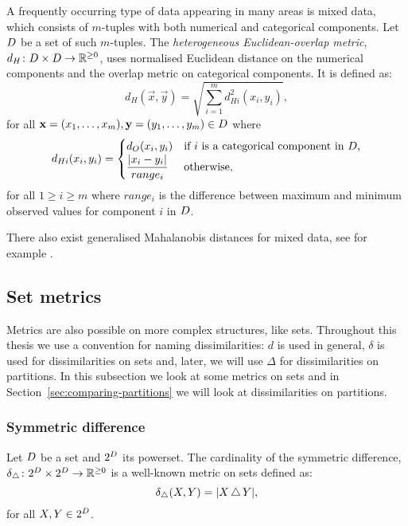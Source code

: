 A frequently occurring type of data appearing in many areas is mixed data,
which consists of $m$-tuples with both numerical and categorical components.
Let $D$ be a set of such $m$-tuples.  The \textit{heterogeneous
  Euclidean-overlap metric}, $d_{H} \colon D \times D \to
\mathbb{R}^{\geq 0}$, uses normalised Euclidean distance on the numerical
components and the overlap metric on categorical components.  It is defined
as:
\begin{equation*}
  d_{H}(\vec{x},\vec{y}) = \sqrt{\sum_{i=1}^{m} d_{Hi}^2(x_i,y_i)},
\end{equation*}
for all $\mathbf{x}=(x_1,\dotsc,x_m),\mathbf{y}=(y_1,\dotsc,y_m) \in D$ where
\begin{equation*}
  d_{Hi}(x_i,y_i) =
  \begin{cases}
    d_O(x_i,y_i) & \text{if $i$ is a categorical component in $D$,} \\
    \displaystyle \frac{|x_i-y_i|}{range_i} & \text{otherwise,}
  \end{cases}
\end{equation*}
for all $1 \geq i \geq m$ where $range_i$ is the difference between maximum
and minimum observed values for component $i$ in $D$.

There also exist generalised Mahalanobis distances for mixed data, see for
example \citep{leon2005generalized}.

\subsection{Set metrics}
\label{sec:set-metric}

Metrics are also possible on more complex structures, like sets.  Throughout
this thesis we use a convention for naming dissimilarities: $d$ is used in
general, $\delta$ is used for dissimilarities on sets and, later, we will use
$\Delta$ for dissimilarities on partitions.  In this subsection we look at
some metrics on sets and in Section~\ref{sec:comparing-partitions} we will
look at dissimilarities on partitions.

\subsubsection{Symmetric difference}
\label{sec:symmetric-difference}

Let $D$ be a set and $2^D$ its powerset.  The cardinality of the
symmetric difference, $\delta_{\operatorname{\bigtriangleup}} \colon 2^{D} \times 2^{D} \to
\mathbb{R}^{\geq 0}$ is a well-known metric on sets defined as:
\begin{equation*}
  \delta_{\operatorname{\bigtriangleup}}(X,Y) = |X \operatorname{\bigtriangleup} Y|,
\end{equation*}
for all $X,Y \in 2^{D}$.

